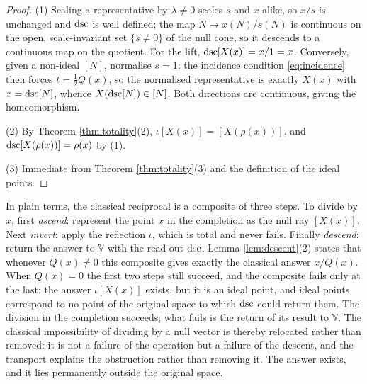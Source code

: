 \begin{proof}
(1) Scaling a representative by $\lambda \neq 0$ scales $s$ and $x$ alike, so $x/s$ is unchanged and $\mathrm{dsc}$ is well defined; the map $N \mapsto x(N)/s(N)$ is continuous on the open, scale-invariant set $\{s \neq 0\}$ of the null cone, so it descends to a continuous map on the quotient. For the lift, $\mathrm{dsc}[X(x)] = x/1 = x$. Conversely, given a non-ideal $[N]$, normalise $s = 1$; the incidence condition \eqref{eq:incidence} then forces $t = \tfrac12 Q(x)$, so the normalised representative is exactly $X(x)$ with $x = \mathrm{dsc}[N]$, whence $X(\mathrm{dsc}[N]) \in [N]$. Both directions are continuous, giving the homeomorphism.

(2) By Theorem \ref{thm:totality}(2), $\iota[X(x)] = [X(\rho(x))]$, and $\mathrm{dsc}[X(\rho(x))] = \rho(x)$ by (1).

(3) Immediate from Theorem \ref{thm:totality}(3) and the definition of the ideal points.
\end{proof}

\begin{remark}\label{rem:aid}
In plain terms, the classical reciprocal is a composite of three steps. To divide by $x$, first \emph{ascend}: represent the point $x$ in the completion as the null ray $[X(x)]$. Next \emph{invert}: apply the reflection $\iota$, which is total and never fails. Finally \emph{descend}: return the answer to $\mathbb{V}$ with the read-out $\mathrm{dsc}$. Lemma \ref{lem:descent}(2) states that whenever $Q(x) \neq 0$ this composite gives exactly the classical answer $x/Q(x)$. When $Q(x) = 0$ the first two steps still succeed, and the composite fails only at the last: the answer $\iota[X(x)]$ exists, but it is an ideal point, and ideal points correspond to no point of the original space to which $\mathrm{dsc}$ could return them. The division in the completion succeeds; what fails is the return of its result to $\mathbb{V}$. The classical impossibility of dividing by a null vector is thereby relocated rather than removed: it is not a failure of the operation but a failure of the descent, and the transport explains the obstruction rather than removing it. The answer exists, and it lies permanently outside the original space.
\end{remark}

